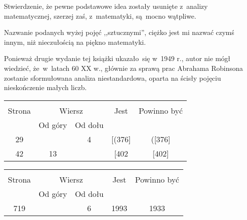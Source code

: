 \documentclass[a4paper,11pt]{article}
\begin{document}
\vspace{\spaceFour}


\start {} Stwierdzenie, że pewne podstawowe idea zostały
usunięte z~analizy matematycznej, szerzej zaś, z~matematyki, są~mocno
wątpliwe.

\vspace{\spaceFour}


\start {} Nazwanie podanych wyżej pojęć ,,sztucznymi'',
ciężko jest mi nazwać czymś innym, niż nieczułością na piękno
matematyki.

\vspace{\spaceFour}


\start {} Ponieważ drugie wydanie tej książki ukazało~się w~1949
r., autor nie mógł wiedzieć, że~w~latach 60 XX w., głównie za sprawą
prac Abrahama Robinsona zostanie sformułowana analiza niestandardowa,
oparta na ścisły pojęciu nieskończenie małych liczb.


\begin{center}
  \begin{tabular}{|c|c|c|c|c|}
    \hline
    & \multicolumn{2}{c|}{} & & \\
    Strona & \multicolumn{2}{c|}{Wiersz} & Jest
                              & Powinno być \\ \cline{2-3}
    & Od góry & Od dołu & & \\
    \hline
    29 & & 4 & [(376] & ([376] \\
    42 & 13 & & [402 & [402] \\
    \hline
  \end{tabular}
\end{center}

\vspace{\spaceTwo}







\begin{center}
  \begin{tabular}{|c|c|c|c|c|}
    \hline
    & \multicolumn{2}{c|}{} & & \\
    Strona & \multicolumn{2}{c|}{Wiersz} & Jest
                              & Powinno być \\ \cline{2-3}
    & Od góry & Od dołu & & \\
    \hline
    719 & &  6 & 1993 & 1933 \\
    \hline
  \end{tabular}
\end{center}
\end{document}
